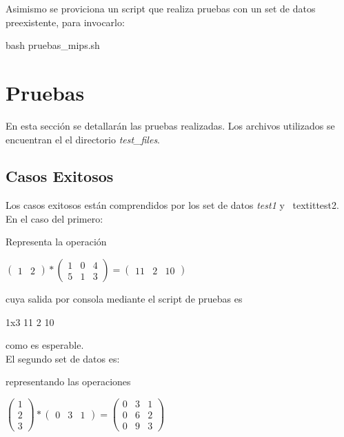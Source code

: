 \documentclass[10pt,a4paper]{article}
\begin{document}
		Asimismo se proviciona un script que realiza pruebas con un set de datos preexistente, para invocarlo: 
		\begin{bash}
		bash pruebas_mips.sh
		\end{bash}

\section{Pruebas}
	En esta sección se detallarán las pruebas realizadas. Los archivos utilizados se encuentran el el directorio \textit{test\_files}.
	\subsection{Casos Exitosos}
		Los casos exitosos están comprendidos por los set de datos \textit{test1} y \	textit{test2}.	
		En el caso del	 primero:\	
	
		
	
		Representa la operación
		\begin{center}
		$\begin{pmatrix}
		1 & 2
		\end{pmatrix}
		*
		\begin{pmatrix}
		1 & 0 & 4 \\ 5 & 1 & 3
		\end{pmatrix}
		=
		\begin{pmatrix}
		11 & 2 & 10
		\end{pmatrix}
		$
		\end{center}
	
		cuya salida por consola mediante el script de pruebas es
	
		\begin{bash}
		1x3 11 2 10
		\end{bash}
	
		como es esperable.\\
	
		El segundo set de datos es:
		
	
		representando las operaciones
	
		\begin{center}
		$\begin{pmatrix}
		1 \\ 2 \\ 3
		\end{pmatrix}
		*
		\begin{pmatrix}
		0 & 3 & 1
		\end{pmatrix}
		=
		\begin{pmatrix}
		0 & 3 & 1 \\ 0 & 6 & 2 \\ 0 & 9 & 3
		\end{pmatrix}
		$\end{center}
	
\end{document}
